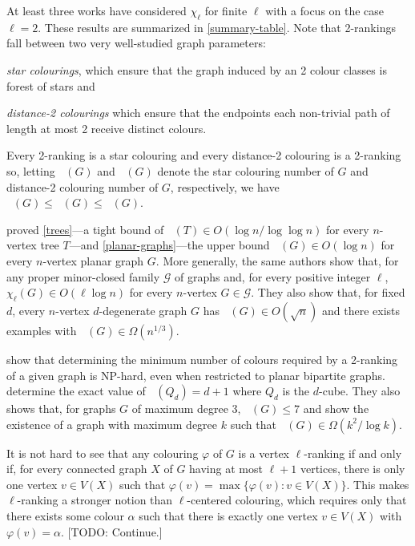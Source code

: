 \documentclass[kpfonts]{patmorin}
\DeclareMathOperator{\trn}{\chi_2}
\DeclareMathOperator{\dtcn}{\bar{\chi}_2}
\DeclareMathOperator{\scn}{\chi_{\star}}
\theoremstyle{named}
\begin{document}
At least three works have considered $\chi_\ell$ for finite $\ell$ with a focus on the case $\ell=2$.  These results are summarized in \cref{summary-table}.  Note that 2-rankings fall between two very well-studied graph parameters:
\begin{compactitem}
    \item \emph{star colourings}, which ensure that the graph induced by an 2 colour classes is forest of stars and
    \item \emph{distance-2 colourings} which ensure that the endpoints each non-trivial path of length at most 2 receive distinct colours.
\end{compactitem}
Every 2-ranking is a star colouring and every distance-2 colouring is a 2-ranking so, letting $\scn(G)$ and $\dtcn(G)$ denote the star colouring number of $G$ and distance-2 colouring number of $G$, respectively, we have $\scn(G) \le \trn(G)\le \dtcn(G)$.

\citet{karpas.neiman.ea:on} proved \cref{trees}---a tight bound of $\trn(T)\in O(\log n/\log\log n)$ for every $n$-vertex tree $T$---and \cref{planar-graphs}---the upper bound $\trn(G)\in O(\log n)$ for every $n$-vertex planar graph $G$.  More generally, the same authors show that, for any proper minor-closed family $\mathcal{G}$ of graphs and, for every positive integer $\ell$, $\chi_\ell(G)\in O(\ell\log n)$ for every $n$-vertex $G\in\mathcal{G}$.  They also show that, for fixed $d$, every $n$-vertex $d$-degenerate graph $G$ has $\trn(G)\in O(\sqrt{n})$ and there exists examples with $\trn(G)\in\Omega(n^{1/3})$.

\citet{shalu.antony:complexity} show that determining the minimum number of colours required by a 2-ranking of a given graph is NP-hard, even when restricted to planar bipartite graphs.  \citet{almeter.demircan.ea:graph} determine the exact value of $\trn(Q_d)=d+1$ where $Q_d$ is the $d$-cube.  They also shows that, for graphs $G$ of maximum degree 3, $\trn(G)\le 7$ and show the existence of a graph with maximum degree $k$ such that $\trn(G)\in\Omega(k^2/\log k)$.

It is not hard to see that any colouring $\varphi$ of $G$ is a vertex $\ell$-ranking if and only if, for every connected graph $X$ of $G$ having at most $\ell+1$ vertices, there is only one vertex $v\in V(X)$ such that $\varphi(v)=\max\{\varphi(v):v\in V(X)\}$.  This makes $\ell$-ranking a stronger notion than $\ell$-centered colouring, which requires only that there exists some colour $\alpha$ such that there is exactly one vertex $v\in V(X)$ with $\varphi(v)=\alpha$. [TODO: Continue.]
\end{document}
